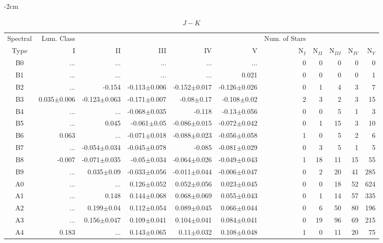 \begin{table}[t]
\tiny
\centering
\caption{$J-K$}
\begin{center}
    \addtolength{\leftskip} {-2cm}
    \addtolength{\rightskip}{-2cm}
    \begin{tabular}{c|rrrrr|rrrrr}
    \toprule
    Spectral & Lum. Class & & & & & Num. of Stars & & & &  \\
    Type & I & II & III &  IV & V & N$_{I}$ & N$_{II}$ & N$_{III}$ & N$_{IV}$ & N$_{V}$ \\ \midrule
  
B0	&	 ...	&	 ...	&	 ...	&	 ...	&	 ...	&	0	&	0	&	0	&	0	&	0	\\
B1	&	 ...	&	 ...	&	 ...	&	 ...	&	0.021	&	0	&	0	&	0	&	0	&	1	\\
B2	&	 ...	&	-0.154	&	-0.113$\pm$0.006	&	-0.152$\pm$0.017	&	-0.126$\pm$0.026	&	0	&	1	&	4	&	3	&	7	\\
B3	&	0.035$\pm$0.006	&	-0.123$\pm$0.063	&	-0.171$\pm$0.007	&	-0.08$\pm$0.17	&	-0.108$\pm$0.02	&	2	&	3	&	2	&	3	&	15	\\
B4	&	 ...	&	 ...	&	-0.068$\pm$0.035	&	-0.118	&	-0.13$\pm$0.056	&	0	&	0	&	5	&	1	&	3	\\
B5	&	 ...	&	0.045	&	-0.061$\pm$0.05	&	-0.086$\pm$0.015	&	-0.072$\pm$0.042	&	0	&	1	&	15	&	3	&	10	\\
B6	&	0.063	&	 ...	&	-0.071$\pm$0.018	&	-0.088$\pm$0.023	&	-0.056$\pm$0.058	&	1	&	0	&	5	&	2	&	6	\\
B7	&	 ...	&	-0.054$\pm$0.034	&	-0.045$\pm$0.078	&	-0.085	&	-0.081$\pm$0.029	&	0	&	3	&	5	&	1	&	5	\\
B8	&	-0.007	&	-0.071$\pm$0.035	&	-0.05$\pm$0.034	&	-0.064$\pm$0.026	&	-0.049$\pm$0.043	&	1	&	18	&	11	&	15	&	55	\\
B9	&	 ...	&	0.035$\pm$0.09	&	-0.033$\pm$0.056	&	-0.011$\pm$0.044	&	-0.006$\pm$0.047	&	0	&	2	&	20	&	41	&	285	\\
A0	&	 ...	&	 ...	&	0.126$\pm$0.052	&	0.052$\pm$0.056	&	0.023$\pm$0.045	&	0	&	0	&	18	&	52	&	624	\\
A1	&	 ...	&	0.148	&	0.144$\pm$0.068	&	0.068$\pm$0.069	&	0.055$\pm$0.043	&	0	&	1	&	14	&	57	&	335	\\
A2	&	 ...	&	0.199$\pm$0.04	&	0.112$\pm$0.054	&	0.089$\pm$0.045	&	0.066$\pm$0.044	&	0	&	6	&	50	&	80	&	196	\\
A3	&	 ...	&	0.156$\pm$0.047	&	0.109$\pm$0.041	&	0.104$\pm$0.041	&	0.084$\pm$0.041	&	0	&	19	&	96	&	69	&	215	\\
A4	&	0.183	&	 ...	&	0.143$\pm$0.065	&	0.11$\pm$0.032	&	0.108$\pm$0.048	&	1	&	0	&	11	&	20	&	75	\\

\end{tabular}
\end{center}
\end{table}
